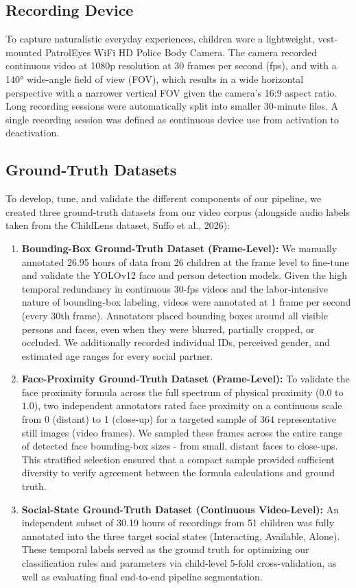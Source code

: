 \documentclass[
  english,
  12pt,
  man,floatsintext]{apa6}
\providecommand{\tightlist}{%
  \setlength{\itemsep}{0pt}\setlength{\parskip}{0pt}}
\begin{document}
\subsection{Recording Device}\label{recording}

To capture naturalistic everyday experiences, children wore a lightweight, vest-mounted PatrolEyes WiFi HD Police Body Camera. The camera recorded continuous video at 1080p resolution at 30 frames per second (fps), and with a 140° wide-angle field of view (FOV), which results in a wide horizontal perspective with a narrower vertical FOV given the camera's 16:9 aspect ratio. Long recording sessions were automatically split into smaller 30-minute files. A single recording session was defined as continuous device use from activation to deactivation.

\subsection{Ground-Truth Datasets}\label{annotations}

To develop, tune, and validate the different components of our pipeline, we created three ground-truth datasets from our video corpus (alongside audio labels taken from the ChildLens dataset, Suffo et al., 2026):

\begin{enumerate}
\def\labelenumi{\arabic{enumi}.}
\tightlist
\item
  \textbf{Bounding-Box Ground-Truth Dataset (Frame-Level):} We manually annotated 26.95 hours of data from 26 children at the frame level to fine-tune and validate the YOLOv12 face and person detection models. Given the high temporal redundancy in continuous 30-fps videos and the labor-intensive nature of bounding-box labeling, videos were annotated at 1 frame per second (every 30th frame). Annotators placed bounding boxes around all visible persons and faces, even when they were blurred, partially cropped, or occluded. We additionally recorded individual IDs, perceived gender, and estimated age ranges for every social partner.
\item
  \textbf{Face-Proximity Ground-Truth Dataset (Frame-Level):} To validate the face proximity formula across the full spectrum of physical proximity (\(0.0\) to \(1.0\)), two independent annotators rated face proximity on a continuous scale from 0 (distant) to 1 (close-up) for a targeted sample of 364 representative still images (video frames). We sampled these frames across the entire range of detected face bounding-box sizes - from small, distant faces to close-ups. This stratified selection ensured that a compact sample provided sufficient diversity to verify agreement between the formula calculations and ground truth.
\item
  \textbf{Social-State Ground-Truth Dataset (Continuous Video-Level):} An independent subset of 30.19 hours of recordings from 51 children was fully annotated into the three target social states (Interacting, Available, Alone). These temporal labels served as the ground truth for optimizing our classification rules and parameters via child-level 5-fold cross-validation, as well as evaluating final end-to-end pipeline segmentation.
\end{enumerate}
\end{document}
